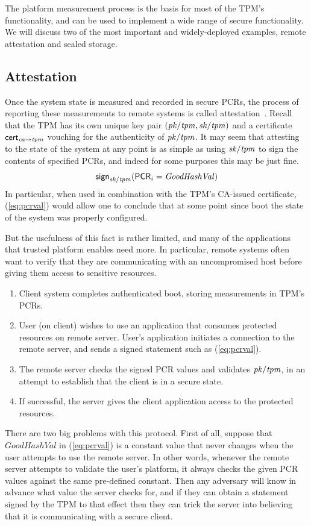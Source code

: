 \documentclass[11pt]{article}
\newcommand{\pk}[1]{\ensuremath{\mi{pk/#1}}}
\newcommand{\sk}[1]{\ensuremath{\mi{sk/#1}}}
\newcommand{\sign}[1]{\ms{sign}_{#1}}
\newcommand{\cert}[2]{\ms{cert}_{{#1} \arrow {#2}}}
\newcommand{\pcr}[1]{\ms{PCR}_{#1}}
\begin{document}
The platform measurement process is the basis for most of the TPM's functionality, and can be used to implement a wide range of secure functionality. We will discuss two of the most important and widely-deployed examples, remote attestation and sealed storage.

\subsection{Attestation}
\label{sec:attestation}

Once the system state is measured and recorded in secure PCRs, the process of reporting these measurements to remote systems is called attestation~\cite{CokerAttestation}. Recall that the TPM has its own unique key pair $(\pk{tpm},\sk{tpm})$ and a certificate $\cert{\mi{ca}}{\mi{tpm}}$ vouching for the authenticity of $\pk{tpm}$. It may seem that attesting to the state of the system at any point is as simple as using $\sk{tpm}$ to sign the contents of specified PCRs, and indeed for some purposes this may be just fine.
\begin{equation}
\label{eq:pcrval}
\sign{\sk{tpm}}(\pcr{i} = \mathit{GoodHashVal})
\end{equation}
In particular, when used in combination with the TPM's CA-issued certificate, (\ref{eq:pcrval}) would allow one to conclude that at some point since boot the state of the system was properly configured.

But the usefulness of this fact is rather limited, and many of the applications that trusted platform enables need more. In particular, remote systems often want to verify that they are communicating with an uncompromised host before giving them access to sensitive resources.
\begin{enumerate}
\item Client system completes authenticated boot, storing measurements in TPM's PCRs.
\item User (on client) wishes to use an application that consumes protected resources on remote server. User's application initiates a connection to the remote server, and sends a signed statement such as (\ref{eq:pcrval}).
\item The remote server checks the signed PCR values and validates $\pk{tpm}$, in an attempt to establish that the client is in a secure state.
\item If successful, the server gives the client application access to the protected resources.
\end{enumerate}
There are two big problems with this protocol. First of all, suppose that $\mathit{GoodHashVal}$ in (\ref{eq:pcrval}) is a constant value that never changes when the user attempts to use the remote server. In other words, whenever the remote server attempts to validate the user's platform, it always checks the given PCR values against the same pre-defined constant. Then any adversary will know in advance what value the server checks for, and if they can obtain a statement signed by the TPM to that effect then they can trick the server into believing that it is communicating with a secure client.
\end{document}

